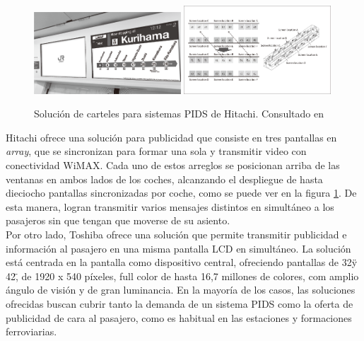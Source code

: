 \begin{figure}[h!]
	\centering
	\includegraphics[width=0.49\textwidth]{./Figures/HitachiCartelPIDS.png}
	\includegraphics[width=0.49\textwidth]{./Figures/HitachiDisplayArray.png}
	\caption{Solución de carteles para sistemas PIDS de Hitachi. Consultado en \citep{Hitachi}}
	\label{fig:Hitachi}
\end{figure}

Hitachi ofrece una solución para publicidad que consiste en tres pantallas en \textit{array}, que se sincronizan para formar una sola y transmitir video con conectividad WiMAX. Cada uno de estos arreglos se posicionan arriba de las ventanas en ambos lados de los coches, alcanzando el despliegue de hasta dieciocho pantallas sincronizadas por coche, como se puede ver en la figura \ref{fig:Hitachi}. De esta manera, logran transmitir varios mensajes distintos en simultáneo a los pasajeros sin que tengan que moverse de su asiento.\\


Por otro lado, Toshiba ofrece una solución que permite transmitir publicidad e información al pasajero en una misma pantalla LCD en simultáneo. La solución está centrada en la pantalla como dispositivo central, ofreciendo pantallas de 32\" y 42\", de 1920 x 540 píxeles, full color de hasta 16,7 millones de colores, com amplio ángulo de visión y de gran luminancia\citep{Toshiba}. En la mayoría de los casos, las soluciones ofrecidas buscan cubrir tanto la demanda de un sistema PIDS como la oferta de publicidad de cara al pasajero, como es habitual en las estaciones y formaciones ferroviarias.\\



